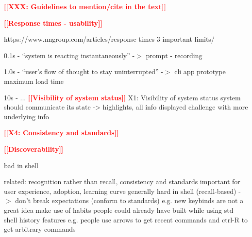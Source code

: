 \documentclass[thesis=M,english]{FITthesis}[2012/10/20]
\newcommand{\todotext}[1]{\textcolor{red}{\textbf{[[#1]]}}}
\newcommand{\permanentframe}[1]{\fbox{#1}}
\begin{document}










\todotext{XXX: Guidelines to mention/cite in the text}

\todotext{Response times - usability}

https://www.nngroup.com/articles/response-times-3-important-limits/

0.1s - “system is reacting instantaneously” -$>$ prompt - recording

1.0s - “user's flow of thought to stay uninterrupted” -$>$ cli app prototype maximum load time

10s - ...
\todotext{Visibility of system status}
X1: Visibility of system status
system should communicate its state -> highlights, all info displayed
challenge with more underlying info

\todotext{X4: Consistency and standards}

\todotext{Discoverability}

bad in shell

related: recognition rather than recall, consistency and standards
important for user experience, adoption, learning curve
generally hard in shell (recall-based)
-$>$ don’t break expectations (conform to standards)
e.g. new keybinds are not a great idea
make use of habits people could already have built while using std shell history features
e.g. people use arrows to get recent commands and ctrl-R to get arbitrary commands
\end{document}
